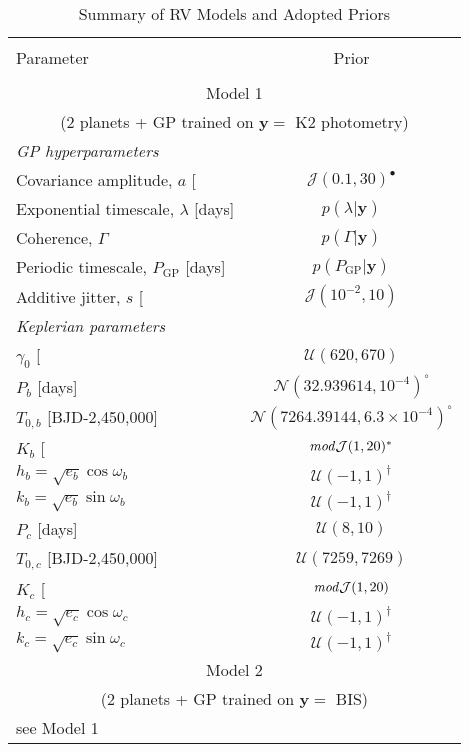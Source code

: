 \begin{table}
\tiny
\renewcommand{\arraystretch}{0.7}
\centering
\caption[]{Summary of RV Models and Adopted Priors}
\label{table:models}
\begin{tabular}{lc}
\hline \\ [-1ex]
Parameter & Prior \smallskip \\
\hline \\ [-1ex]
\multicolumn{2}{c}{Model 1} \\
\multicolumn{2}{c}{(2 planets + GP trained on $\mathbf{y}=$ K2 photometry)} \smallskip \\
\emph{GP hyperparameters} & \\
Covariance amplitude, $a$ [\mps{]} & $\mathcal{J}(0.1,30)^{\bullet}$ \\
Exponential timescale, $\lambda$ [days] & $p(\lambda|\mathbf{y})$ \\
Coherence, $\Gamma$ &  $p(\Gamma|\mathbf{y})$ \\
Periodic timescale, $P_{\text{GP}}$ [days] &  $p(P_{\text{GP}}|\mathbf{y})$ \\
Additive jitter, $s$ [\mps{]} & $\mathcal{J}(10^{-2},10)$ \smallskip \\ 
\emph{Keplerian parameters} & \\
$\gamma_0$ [\mps{]} & $\mathcal{U}(620,670)$ \\
$P_b$ [days] & $\mathcal{N}(32.939614,10^{-4})^{\circ}$ \\
$T_{0,b}$ [BJD-2,450,000] & $\mathcal{N}(7264.39144,6.3 \times 10^{-4})^{\circ}$ \\
$K_b$ [\mps{]} & $\text{\emph{mod}}\mathcal{J}(1,20)^{\ast}$ \\
$h_b = \sqrt{e_b}\cos{\omega_b}$ & $\mathcal{U}(-1,1)^{\dagger}$ \\
$k_b = \sqrt{e_b}\sin{\omega_b}$ & $\mathcal{U}(-1,1)^{\dagger}$ \\
$P_c$ [days] & $\mathcal{U}(8,10)$ \\
$T_{0,c}$ [BJD-2,450,000] & $\mathcal{U}(7259,7269)$ \\
$K_c$ [\mps{]} & $\text{\emph{mod}}\mathcal{J}(1,20)$ \\
$h_c = \sqrt{e_c}\cos{\omega_c}$ & $\mathcal{U}(-1,1)^{\dagger}$ \\
$k_c = \sqrt{e_c}\sin{\omega_c}$ & $\mathcal{U}(-1,1)^{\dagger}$ \medskip \\

\multicolumn{2}{c}{Model 2} \\
\multicolumn{2}{c}{(2 planets + GP trained on $\mathbf{y}=$ BIS)} \smallskip \\
see Model 1 & \\


\end{tabular}
\end{table}
